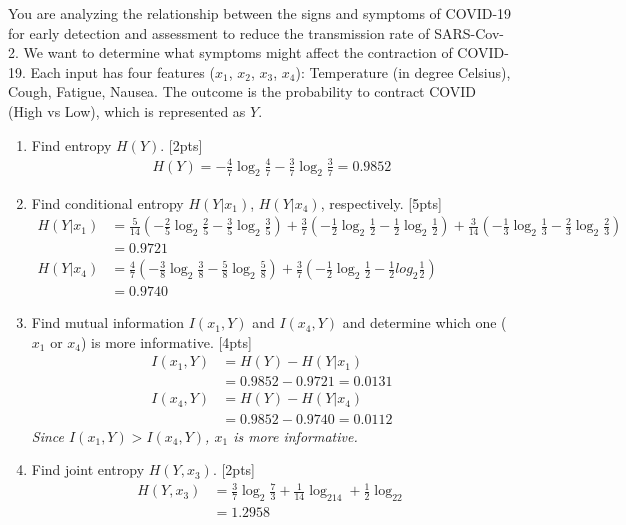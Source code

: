 \documentclass{article}
\begin{document}
You are analyzing the relationship between the signs and symptoms of COVID-19 for early detection and assessment to reduce the transmission rate of SARS-Cov-2. We want to determine what symptoms might affect the contraction of COVID-19. Each input has four features ($x_1$, $x_2$, $x_3$, $x_4$): Temperature (in degree Celsius), Cough, Fatigue, Nausea. The outcome is the probability to contract COVID (High vs Low), which is represented as $Y$.
\begin{enumerate}[label=(\alph*)]
\item Find entropy $H(Y)$. [2pts]\newline\begin{align*}
    H(Y)=-\frac{4}{7}\log_2\frac{4}{7}-\frac{3}{7}\log_2\frac{3}{7}=0.9852
\end{align*}
\item Find conditional entropy $H(Y|x_1)$, $H(Y|x_4)$, respectively. [5pts]\newline\begin{align*}
    H(Y|x_1)&=\frac{5}{14}(-\frac{2}{5}\log_2\frac{2}{5} - \frac{3}{5}\log_2\frac{3}{5}) + \frac{3}{7}(-\frac{1}{2}\log_2\frac{1}{2}-\frac{1}{2}\log_2\frac{1}{2})+\frac{3}{14}(-\frac{1}{3}\log_2\frac{1}{3} - \frac{2}{3}\log_2\frac{2}{3}) \\
    &= 0.9721 \\
    H(Y|x_4)&=\frac{4}{7}(-\frac{3}{8}\log_2\frac{3}{8} - \frac{5}{8}\log_2\frac{5}{8}) + \frac{3}{7}(-\frac{1}{2}\log_2\frac{1}{2} -\frac{1}{2}log_2\frac{1}{2}) \\
    &=0.9740
\end{align*}
\item Find mutual information $I(x_1, Y)$ and $I(x_4, Y)$ and determine which one ($x_1$ or $x_4$) is more informative. [4pts]\newline\begin{align*}
    I(x_1,Y)&=H(Y)-H(Y|x_1) \\
    &=0.9852-0.9721=0.0131 \\
    I(x_4,Y) &=H(Y)-H(Y|x_4) \\
    &=0.9852-0.9740=0.0112
\end{align*}
\emph{Since $I(x_1,Y)>I(x_4,Y)$, $x_1$ is more informative.}
\item Find joint entropy $H(Y, x_3)$. [2pts] \newline\begin{align*}
    H(Y,x_3)&=\frac{3}{7}\log_2\frac{7}{3}+\frac{1}{14}\log_214+\frac{1}{2}\log_22 \\
    &=1.2958
\end{align*}
\end{enumerate}
\end{document}
